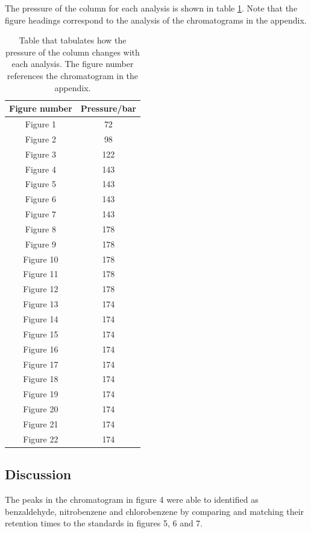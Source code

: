 \documentclass[a4paper, 12pt]{article}
\begin{document}
The pressure of the column for each analysis is shown in table \ref{tab-pressure}. Note that the figure headings correspond to the analysis of the chromatograms in the appendix.

\begin{table}[h!]
	\centering
	\caption{Table that tabulates how the pressure of the column changes with each analysis. The figure number references the chromatogram in the appendix.}
	\begin{tabular}{|c|c|}
		\hline
		Figure number & Pressure/bar\\
		\hline
		Figure 1  & 72 \\ 
		\hline
		Figure 2 & 98 \\
		\hline
		Figure 3 & 122 \\
		\hline
		Figure 4 & 143 \\
		\hline
		Figure 5 & 143 \\
		\hline
		Figure 6 & 143 \\
		\hline
		Figure 7 & 143 \\
		\hline
		Figure 8 & 178 \\
		\hline
		Figure 9 & 178 \\
		\hline
		Figure 10 & 178 \\
		\hline
		Figure 11 & 178 \\
		\hline
		Figure 12 & 178 \\
		\hline
		Figure 13 & 174 \\
		\hline
		Figure 14 & 174 \\
		\hline
		Figure 15 & 174 \\
		\hline
		Figure 16 & 174 \\
		\hline
		Figure 17 & 174 \\
		\hline
		Figure 18 & 174 \\
		\hline
		Figure 19 & 174 \\
		\hline
		Figure 20 & 174 \\
		\hline
		Figure 21 & 174 \\
		\hline
		Figure 22 & 174 \\ 
		\hline
	\end{tabular}
	\label{tab-pressure}
\end{table}

\subsection{Discussion}
The peaks in the chromatogram in figure 4 were able to identified as benzaldehyde, nitrobenzene and chlorobenzene by comparing and matching their retention times to the standards in figures 5, 6 and 7. 
\end{document}

